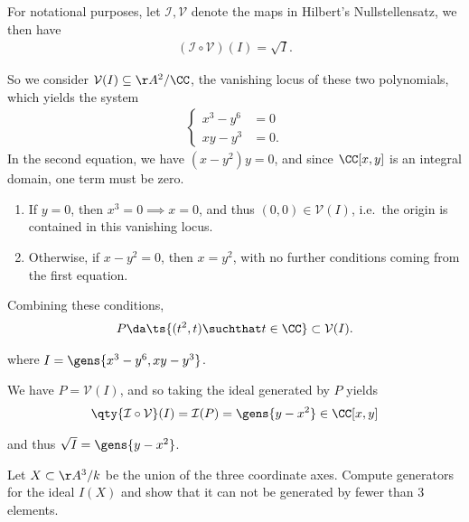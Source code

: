 \begin{solution}

For notational purposes, let \(\mathcal{I}, \mathcal{V}\) denote the
maps in Hilbert's Nullstellensatz, we then have
\begin{align*}(\mathcal{I} \circ \mathcal{V})(I) = \sqrt{I}.\end{align*}

So we consider \(\mathcal{V}(I) \subseteq \AA^2/\CC\), the vanishing
locus of these two polynomials, which yields the system
\begin{align*}  
\begin{cases}
x^3 - y^6 & = 0 \\
xy - y^3 & = 0.
\end{cases}
\end{align*} In the second equation, we have \((x- y^2)y = 0\), and
since \(\CC[x, y]\) is an integral domain, one term must be zero.

\begin{enumerate}
\def\labelenumi{\arabic{enumi}.}
\item
  If \(y=0\), then \(x^3 = 0 \implies x= 0\), and thus
  \((0, 0) \in \mathcal{V}(I)\), i.e.~the origin is contained in this
  vanishing locus.
\item
  Otherwise, if \(x-y^2 = 0\), then \(x=y^2\), with no further
  conditions coming from the first equation.
\end{enumerate}

Combining these conditions,
\begin{align*}P\da \ts{(t^2, t) \suchthat t\in \CC} \subset \mathcal{V}(I).\end{align*}

where \(I = \gens{x^3 - y^6, xy-y^3}\).

We have \(P = \mathcal{V}(I)\), and so taking the ideal generated by
\(P\) yields
\begin{align*}  
\qty{\mathcal{I} \circ \mathcal{V}} (I) = \mathcal{I}(P) = \gens{y-x^2} \in \CC[x ,y]
\end{align*}

and thus \(\sqrt{I} = \gens{y-x^2}\).

\end{solution}

\begin{exercise}[Gathmann 1.22]

Let \(X\subset \AA^3/k\) be the union of the three coordinate axes.
Compute generators for the ideal \(I(X)\) and show that it can not be
generated by fewer than 3 elements.

\end{exercise}

